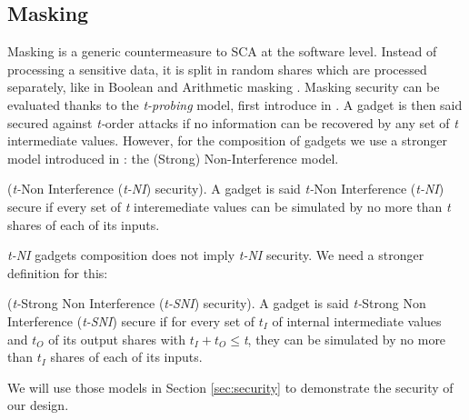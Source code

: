 \documentclass[runningheads]{llncs}
\begin{document}
%
\subsection{Masking}
Masking is a generic countermeasure to SCA at the software level. Instead of processing a sensitive data, it is split in random shares which are processed separately, like in Boolean and Arithmetic masking \cite{mangard2008power}. Masking security can be evaluated thanks to the \emph{t-probing} model, first introduce in \cite{ishai2003private}. A gadget is then said secured against \emph{t-}order attacks if no information can be recovered by any set of \emph{t} intermediate values. However, for the composition of gadgets we use a stronger model introduced in \cite{barthe2016strong}: the (Strong) Non-Interference model.
\begin{definition}
  (\emph{t-}Non Interference (\emph{t-NI}) security). A gadget is said \emph{t-}Non Interference (\emph{t-NI}) secure if every set of \emph{t} interemediate values can be simulated by no more than \emph{t} shares of each of its inputs.
\end{definition}
\emph{t-NI} gadgets composition does not imply \emph{t-NI} security. We need a stronger definition for this:
\begin{definition}
  (\emph{t-}Strong Non Interference (\emph{t-SNI}) security). A gadget is said \emph{t-}Strong Non Interference (\emph{t-SNI}) secure if for every set of $t_I$ of internal intermediate values and $t_O$ of its output shares with $t_I + t_O \leq$\emph{t}, they can be simulated by no more than $t_I$ shares of each of its inputs.
\end{definition}

We will use those models in Section \ref{sec:security} to demonstrate the security of our design.
\end{document}
